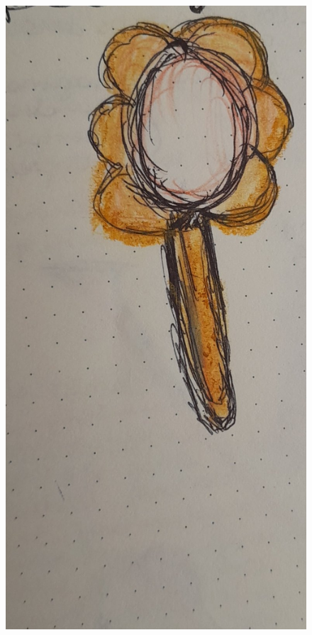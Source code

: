 \documentclass[12pt, a4paper, twoside]{book} %
\begin{document}
\begin{figure}[H]
	\centering
	\includegraphics[width=\textwidth]{./images/1f81324ddf220c.jpg}
\end{figure}
\end{document}

